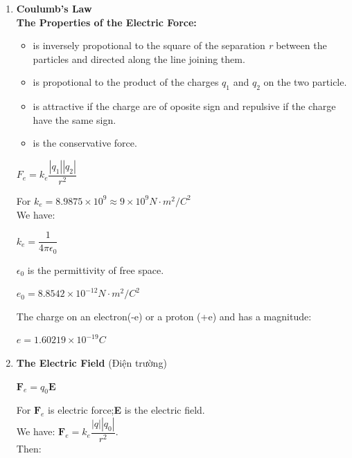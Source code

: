 \documentclass[10pt]{article}
\begin{document}
\begin{enumerate}
	\item \textbf{Coulumb's Law}\\
	\textbf{The Properties of the Electric Force:}
	\begin{itemize}
		\item is inversely propotional to the square of the separation \textit{r} between the particles and directed along the line joining them.
		\item is propotional to the product of the charges \textit{$q_1$} and \textit{$q_2$} on the two particle.
		\item is attractive if the charge are of oposite sign and repulsive if the charge have the same sign.
		\item is the conservative force.
	\end{itemize}
	\begin{mybox}
	\begin{center}
	$F_e = k_e \dfrac{|q_1||q_2|}{r^2}$
	\end{center}
	\end{mybox}
	For $k_e = 8.9875 \times 10^9 \approx 9 \times 10^9 N \cdot m^2/C^2$\\
	We have:
	\begin{mybox}
	\begin{center}
	$k_e = \dfrac{1}{4 \pi \epsilon_0}$
	\end{center}
	\end{mybox}
	$\epsilon_0$ is the permittivity of free space.
	\begin{center}
	$\textit{e}_0 = 8.8542 \times 10^{-12} N \cdot m^2 /C^2$
	\end{center}
	The charge on an electron(-e) or a proton (+e) and has a magnitude:
	\begin{center}
	$\textit{e} = 1.60219 \times 10^{-19} C$
	\end{center}
	\item \textbf{The Electric Field} (Điện trường)\\
	\begin{mybox}
	\begin{center}
	$\textbf{F}_e = q_0 \textbf{E}$
	\end{center}
	\end{mybox}
	For $\textbf{F}_e$ is electric force;\textbf{E} is the electric field.\\
	We have: $\textbf{F}_e = k_e \dfrac{|q||q_0|}{r^2}$.\\
	Then:
	\begin{center}

\end{center}
\end{enumerate}
\end{document}
